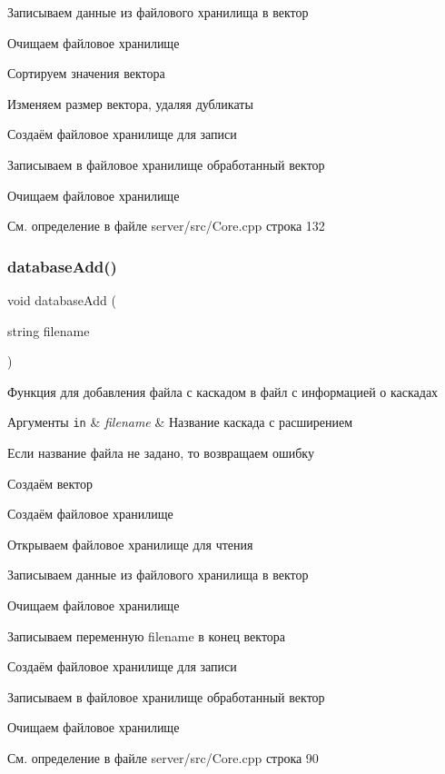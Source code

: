 Записываем данные из файлового хранилища в вектор

Очищаем файловое хранилище

Сортируем значения вектора

Изменяем размер вектора, удаляя дубликаты

Создаём файловое хранилище для записи

Записываем в файловое хранилище обработанный вектор

Очищаем файловое хранилище 

См. определение в файле server/src/\+Core.\+cpp строка 132

\mbox{\label{group__corecpp_ga10a0271bceabc9c1a0d736ab93113212}} 
\subsubsection{\texorpdfstring{database\+Add()}{databaseAdd()}}
{\footnotesize\ttfamily void database\+Add (\begin{DoxyParamCaption}\item[{string}]{filename }\end{DoxyParamCaption})}



Функция для добавления файла с каскадом в файл с информацией о каскадах 


\begin{DoxyParams}[1]{Аргументы}
\mbox{\tt in}  & {\em filename} & Название каскада с расширением \\
\hline
\end{DoxyParams}
Если название файла не задано, то возвращаем ошибку

Создаём вектор

Создаём файловое хранилище

Открываем файловое хранилище для чтения

Записываем данные из файлового хранилища в вектор

Очищаем файловое хранилище

Записываем переменную filename в конец вектора

Создаём файловое хранилище для записи

Записываем в файловое хранилище обработанный вектор

Очищаем файловое хранилище 

См. определение в файле server/src/\+Core.\+cpp строка 90


